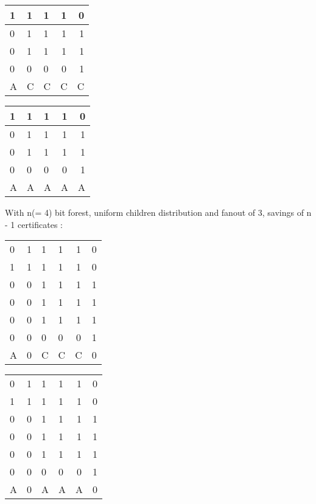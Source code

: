 \begin{multicols}{2}

	\begin{tabular}{ l | l l c r }
	  1 & 1 & 1 & 1 & 0 \\
	  \hline
	  0 & 1 & 1 & 1 & 1 \\
	  0 & 1 & 1 & 1 & 1 \\
	  0 & 0 & 0 & 0 & 1 \\
	  \hline	
	  A & C & C & C & C\\
	\end{tabular}
\columnbreak{|}
	\begin{tabular}{ l | l l c r }
	  1 & 1 & 1 & 1 & 0 \\
	  \hline
	  0 & 1 & 1 & 1 & 1 \\
	  0 & 1 & 1 & 1 & 1 \\
	  0 & 0 & 0 & 0 & 1 \\
	  \hline	
	  A & A & A & A & A\\
	\end{tabular}
\end{multicols}

With n(= 4) bit forest, uniform children distribution and fanout of 3, savings of n - 1 certificates :

\begin{multicols}{2}

	\begin{tabular}{ l l |l l c r }
	  0 & 1 & 1 & 1 & 1 & 0 \\
	  1 & 1 & 1 & 1 & 1 & 0 \\
	  \hline
	  0 & 0 & 1 & 1 & 1 & 1 \\
	  0 & 0 & 1 & 1 & 1 & 1 \\
	  0 & 0 & 1 & 1 & 1 & 1 \\
	  0 & 0 & 0 & 0 & 0 & 1 \\
	  \hline	
	  A & 0 & C & C & C & 0 \\
	\end{tabular}
\columnbreak{|}
	\begin{tabular}{ l l | l l c r }
	  0 & 1 & 1 & 1 & 1 & 0 \\
	  1 & 1 & 1 & 1 & 1 & 0 \\
	  \hline
	  0 & 0 & 1 & 1 & 1 & 1 \\
	  0 & 0 & 1 & 1 & 1 & 1 \\
	  0 & 0 & 1 & 1 & 1 & 1 \\
	  0 & 0 & 0 & 0 & 0 & 1 \\
	  \hline
	  A & 0 & A & A & A & 0\\

	\end{tabular}

\end{multicols}

